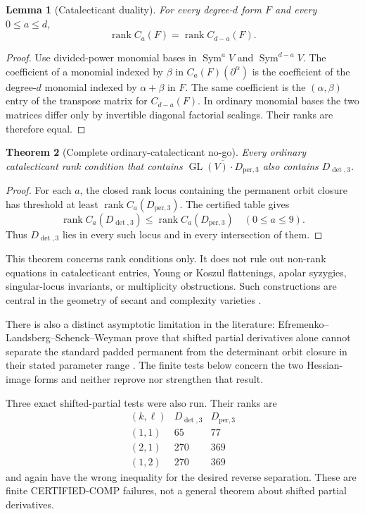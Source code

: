 \documentclass[11pt]{article}
\newtheorem{theorem}{Theorem}[section]
\newtheorem{lemma}[theorem]{Lemma}
\theoremstyle{definition}
\theoremstyle{remark}
\DeclareMathOperator{\rk}{rank}
\newcommand{\Sym}{\operatorname{Sym}}
\newcommand{\GL}{\operatorname{GL}}
\newcommand{\status}[1]{\textsf{#1}}
\begin{document}
\begin{lemma}[Catalecticant duality]\label{lem:catduality}
For every degree-$d$ form $F$ and every $0\le a\le d$,
\[
 \rk C_a(F)=\rk C_{d-a}(F).
\]
\end{lemma}
\begin{proof}
Use divided-power monomial bases in $\Sym^aV$ and $\Sym^{d-a}V$.
The coefficient of a monomial indexed by $\beta$ in
$C_a(F)(\partial^\alpha)$ is the coefficient of the degree-$d$ monomial
indexed by $\alpha+\beta$ in $F$.  The same coefficient is the
$(\alpha,\beta)$ entry of the transpose matrix for $C_{d-a}(F)$.  In ordinary
monomial bases the two matrices differ only by invertible diagonal factorial
scalings.  Their ranks are therefore equal.
\end{proof}

\begin{theorem}[Complete ordinary-catalecticant no-go]\label{thm:catblind}
Every ordinary catalecticant rank condition that contains
$\overline{\GL(V)\cdot D_{\mathrm{per},3}}$ also contains
$D_{\det,3}$.
\end{theorem}
\begin{proof}
For each $a$, the closed rank locus containing the permanent orbit closure has
threshold at least $\rk C_a(D_{\mathrm{per},3})$.  The certified table gives
\[
\rk C_a(D_{\det,3})\le\rk C_a(D_{\mathrm{per},3})
\quad(0\le a\le9).
\]
Thus $D_{\det,3}$ lies in every such locus and in every intersection of them.
\end{proof}

This theorem concerns rank conditions only.  It does not rule out non-rank
equations in catalecticant entries, Young or Koszul flattenings, apolar
syzygies, singular-locus invariants, or multiplicity obstructions.  Such
constructions are central in the geometry of secant and complexity varieties
\cite{LandsbergOttaviani2013,Guan2017}.

There is also a distinct asymptotic limitation in the literature:
Efremenko--Landsberg--Schenck--Weyman prove that shifted partial derivatives
alone cannot separate the standard padded permanent from the determinant orbit
closure in their stated parameter range \cite{ELSW2016}.  The finite tests below
concern the two Hessian-image forms and neither reprove nor strengthen that
result.

Three exact shifted-partial tests were also run.  Their ranks are
\[
\begin{array}{c|cc}
(k,\ell)&D_{\det,3}&D_{\mathrm{per},3}\\\hline
(1,1)&65&77\\
(2,1)&270&369\\
(1,2)&270&369
\end{array}
\]
and again have the wrong inequality for the desired reverse separation.  These
are finite \status{CERTIFIED-COMP} failures, not a general theorem about shifted
partial derivatives.
\end{document}
